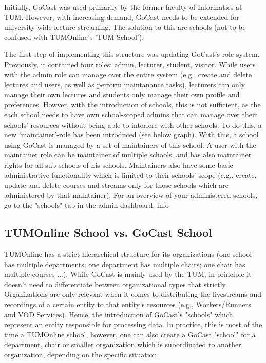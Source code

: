 Initially, GoCast was used primarily by the former faculty of Informatics at TUM. However, with increasing demand, GoCast needs to be extended for university-wide lecture streaming. The solution to this are schools (not to be confused with TUMOnline's 'TUM School').

The first step of implementing this structure was updating GoCast's role system. Previously, it contained four roles: admin, lecturer, student, visitor. While users with the admin role can manage over the entire system (e.g., create and delete lectures and users, as well as perform maintanance tasks), lecturers can only manage their own lectures and students only manage their own profile and preferences. Howver, with the introduction of schools, this is not sufficient, as the each school needs to have own school-scoped admins that can manage over their schools' resources without being able to interfere with other schools. To do this, a new 'maintainer'-role has been introduced (see below graph).
With this, a school using GoCast is managed by a set of maintainers of this school. A user with the maintainer role can be maintainer of multiple schools, and has also maintainer rights for all sub-schools of his schools.  
Maintainers also have some basic administrative functionality which is limited to their schools' scope (e.g., create, update and delete courses and streams only for those schools which are administered by that maintainer). For an overview of your administered schools, go to the "schools"-tab in the admin dashboard.
info

\subsection{TUMOnline School vs. GoCast School}

TUMOnline has a strict hierarchical structure for its organizations (one school has multiple departments; one department has multiple chairs; one chair has multiple courses ...).
%
While GoCast is mainly used by the TUM, in principle it doesn't need to differentiate between organizational types that strictly. Organizations are only relevant when it comes to distributing the livestreams and recordings of a certain entity to that entity's resources (e.g., Workers/Runners and VOD Services). Hence, the introduction of GoCast's "schools" which represent an entity responsible for processing data. In practice, this is most of the time a TUMOnline school, however, one can also create a GoCast "school" for a department, chair or smaller organization which is subordinated to another organization, depending on the specific situation.

